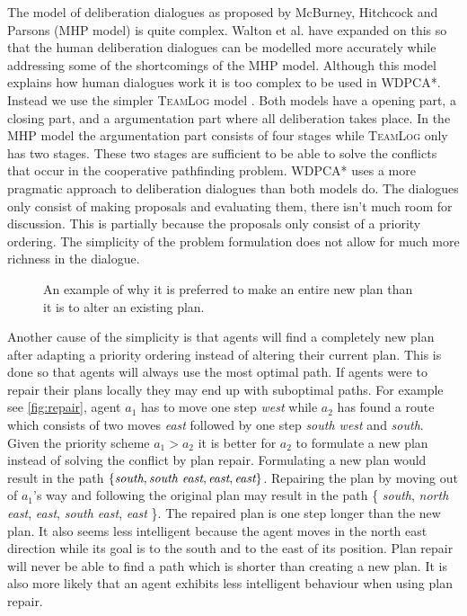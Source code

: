 The model of deliberation dialogues as proposed by McBurney, Hitchcock and
Parsons (MHP model) \cite{mcburney2007} is quite complex. Walton et al.
\cite{walton2014} have expanded on this so that the human deliberation
dialogues can be modelled more accurately while addressing some of the
shortcomings of the MHP model. Although this model explains how human dialogues
work it is too complex to be used in WDPCA*. Instead we use the simpler
\textsc{TeamLog} model \cite{dunin-keplicz2011}. Both models have a
opening part, a closing part, and a argumentation part where all
deliberation takes place. In the MHP model the argumentation part consists of
four stages while \textsc{TeamLog} only has two stages. These two stages are
sufficient to be able to solve the conflicts that occur in the cooperative
pathfinding problem. WDPCA* uses a more pragmatic approach to deliberation
dialogues than both models do. The dialogues only consist of making proposals
and evaluating them, there isn't much room for discussion. This is partially
because the proposals only consist of a priority ordering. The simplicity of
the problem formulation does not allow for much more richness in the dialogue.

\begin{figure}[t]
    \centering
    \def\svgscale{.7}
    
    \caption{An example of why it is preferred to make an entire new plan than
    it is to alter an existing plan.}
    \label{fig:repair}
\end{figure}

Another cause of the simplicity is that agents will find a completely new plan
after adapting a priority ordering instead of altering their current plan. This
is done so that agents will always use the most optimal path. If agents were to
repair their plans locally they may end up with suboptimal paths. For example
see \autoref{fig:repair}, agent $a_1$ has to move one step \emph{west} while
$a_2$ has found a route which consists of two moves \emph{east} followed by one
step \emph{south west} and \emph{south}. Given the priority scheme $a_1 > a_2$
it is better for $a_2$ to formulate a new plan instead of solving the conflict
by plan repair. Formulating a new plan would result in the path $\{
\emph{south}, \emph{south east}, \emph{east}, \emph{east} \}$. Repairing the
plan by moving out of $a_1$'s way and following the original plan may result in
the path \{ \emph{south}, \emph{north east}, \emph{east}, \emph{south east},
\emph{east} \}. The repaired plan is one step longer than the new plan. It also
seems less intelligent because the agent moves in the north east direction
while its goal is to the south and to the east of its position. Plan repair
will never be able to find a path which is shorter than creating a new plan. It
is also more likely that an agent exhibits less intelligent behaviour when
using plan repair.


